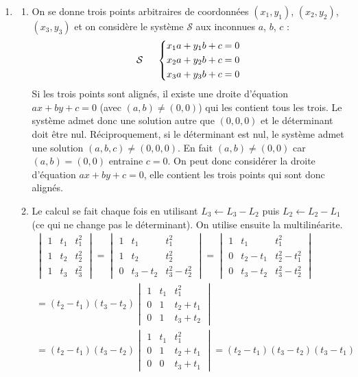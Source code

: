 \begin{enumerate}
 \item 
\begin{enumerate}
 \item On se donne trois points arbitraires de coordonnées $(x_1,y_1)$, $(x_2,y_2)$, $(x_3,y_3)$ et on considère le système $\mathcal S$ aux inconnues $a$, $b$, $c$ :
\begin{displaymath}
 \mathcal{S}\hspace{0.5cm}
\left\lbrace
\begin{aligned}
x_1 a + y_1 b +c &=0 \\ 
x_2 a + y_2 b +c &=0 \\
x_3 a + y_3 b +c &=0 
\end{aligned}
\right. 
\end{displaymath}
Si les trois points sont alignés, il existe une droite d'équation $ax+by+c=0$ (avec $(a,b)\neq(0,0)$) qui les contient tous les trois. Le système admet donc une solution autre que $(0,0,0)$ et le déterminant doit être nul.\newline
Réciproquement, si le déterminant est nul, le système admet une solution $(a,b,c)\neq(0,0,0)$. En fait $(a,b)\neq(0,0)$ car $(a,b)=(0,0)$ entraine $c=0$. On peut donc considérer la droite d'équation $ax+by+c=0$, elle contient les trois points qui sont donc alignés.
 \item Le calcul se fait chaque fois en utilisant $L_3 \leftarrow L_3 - L_2$ puis $L_2 \leftarrow L_2 - L_1$ (ce qui ne change pas le déterminant). On utilise ensuite la multilinéarite.
\begin{multline*}
  \begin{vmatrix}
  1 & t_1 & t_1^2 \\ 1 & t_2 & t_2^2 \\ 1 & t_3 & t_3^2 
 \end{vmatrix}
=
  \begin{vmatrix}
  1 & t_1 & t_1^2 \\ 1 & t_2 & t_2^2 \\ 0 & t_3-t_2 & t_3^2-t_2^2 
 \end{vmatrix}
=
  \begin{vmatrix}
  1 & t_1 & t_1^2 \\ 0 & t_2-t_1 & t_2^2-t_1^2 \\ 0 & t_3-t_2 & t_3^2-t_2^2 
 \end{vmatrix} \\
= (t_2-t_1)(t_3-t_2)
  \begin{vmatrix}
  1 & t_1 & t_1^2 \\ 0 & 1 & t_2+t_1 \\ 0 & 1 & t_3+t_2 
 \end{vmatrix} \\
= (t_2-t_1)(t_3-t_2)
  \begin{vmatrix}
  1 & t_1 & t_1^2 \\ 0 & 1 & t_2+t_1 \\ 0 & 0 & t_3+t_1 
 \end{vmatrix}
= (t_2-t_1)(t_3-t_2)(t_3-t_1)
\end{multline*}


\end{enumerate}
\end{enumerate}
